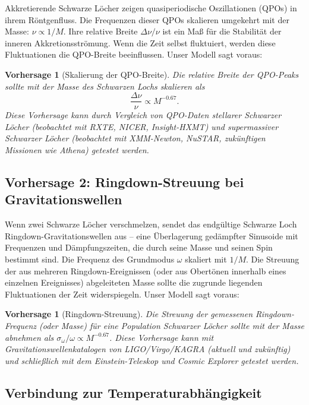 \documentclass[12pt,a4paper]{article}
\newtheorem{prediction}[theorem]{Vorhersage}
\begin{document}
	Akkretierende Schwarze Löcher zeigen quasiperiodische Oszillationen (QPOs) in ihrem Röntgenfluss. Die Frequenzen dieser QPOs skalieren umgekehrt mit der Masse: \(\nu \propto 1/M\). Ihre relative Breite \(\Delta\nu/\nu\) ist ein Maß für die Stabilität der inneren Akkretionsströmung. Wenn die Zeit selbst fluktuiert, werden diese Fluktuationen die QPO-Breite beeinflussen. Unser Modell sagt voraus:
	\begin{prediction}[Skalierung der QPO-Breite]
		Die relative Breite der QPO-Peaks sollte mit der Masse des Schwarzen Lochs skalieren als
		\begin{equation}
			\frac{\Delta\nu}{\nu} \propto M^{-0.67}.
		\end{equation}
		Diese Vorhersage kann durch Vergleich von QPO-Daten stellarer Schwarzer Löcher (beobachtet mit RXTE, NICER, Insight-HXMT) und supermassiver Schwarzer Löcher (beobachtet mit XMM-Newton, NuSTAR, zukünftigen Missionen wie Athena) getestet werden.
	\end{prediction}
	
	\subsection{Vorhersage 2: Ringdown-Streuung bei Gravitationswellen}
	
	Wenn zwei Schwarze Löcher verschmelzen, sendet das endgültige Schwarze Loch Ringdown-Gravitationswellen aus – eine Überlagerung gedämpfter Sinusoide mit Frequenzen und Dämpfungszeiten, die durch seine Masse und seinen Spin bestimmt sind. Die Frequenz des Grundmodus \(\omega\) skaliert mit \(1/M\). Die Streuung der aus mehreren Ringdown-Ereignissen (oder aus Obertönen innerhalb eines einzelnen Ereignisses) abgeleiteten Masse sollte die zugrunde liegenden Fluktuationen der Zeit widerspiegeln. Unser Modell sagt voraus:
	\begin{prediction}[Ringdown-Streuung]
		Die Streuung der gemessenen Ringdown-Frequenz (oder Masse) für eine Population Schwarzer Löcher sollte mit der Masse abnehmen als \(\sigma_{\omega}/\omega \propto M^{-0.67}\). Diese Vorhersage kann mit Gravitationswellenkatalogen von LIGO/Virgo/KAGRA (aktuell und zukünftig) und schließlich mit dem Einstein-Teleskop und Cosmic Explorer getestet werden.
	\end{prediction}
	
	\subsection{Verbindung zur Temperaturabhängigkeit}
	
\end{document}
